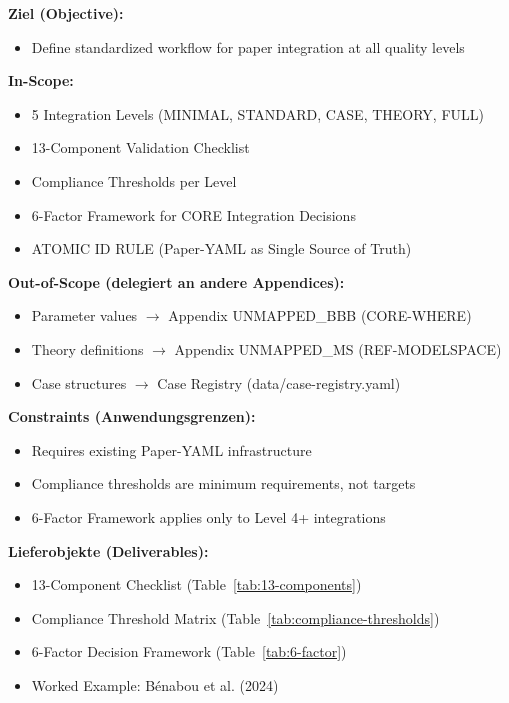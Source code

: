 \begin{tcolorbox}[
    colback=orange!5!white,
    colframe=orange!75!black,
    title={\textbf{Appendix Scope: Ziel / In-Scope / Out-of-Scope / Constraints}},
    fonttitle=\bfseries
]

\textbf{Ziel (Objective):}
\begin{itemize}[nosep]
    \item Define standardized workflow for paper integration at all quality levels
\end{itemize}

\textbf{In-Scope:}
\begin{itemize}[nosep]
    \item 5 Integration Levels (MINIMAL, STANDARD, CASE, THEORY, FULL)
    \item 13-Component Validation Checklist
    \item Compliance Thresholds per Level
    \item 6-Factor Framework for CORE Integration Decisions
    \item ATOMIC ID RULE (Paper-YAML as Single Source of Truth)
\end{itemize}

\textbf{Out-of-Scope (delegiert an andere Appendices):}
\begin{itemize}[nosep]
    \item Parameter values $\rightarrow$ Appendix UNMAPPED_BBB (CORE-WHERE)
    \item Theory definitions $\rightarrow$ Appendix UNMAPPED_MS (REF-MODELSPACE)
    \item Case structures $\rightarrow$ Case Registry (data/case-registry.yaml)
\end{itemize}

\textbf{Constraints (Anwendungsgrenzen):}
\begin{itemize}[nosep]
    \item Requires existing Paper-YAML infrastructure
    \item Compliance thresholds are minimum requirements, not targets
    \item 6-Factor Framework applies only to Level 4+ integrations
\end{itemize}

\textbf{Lieferobjekte (Deliverables):}
\begin{itemize}[nosep]
    \item 13-Component Checklist (Table~\ref{tab:13-components})
    \item Compliance Threshold Matrix (Table~\ref{tab:compliance-thresholds})
    \item 6-Factor Decision Framework (Table~\ref{tab:6-factor})
    \item Worked Example: Bénabou et al. (2024)
\end{itemize}

\end{tcolorbox}


